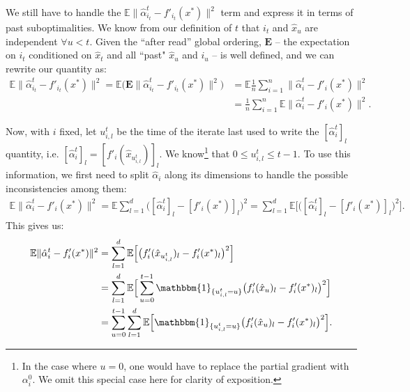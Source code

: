 \documentclass[twoside, 11pt]{article}
\newcommand{\E}{\mathbb{E}}
\newcommand{\Econd}{\mathbf{E}}
\newcommand{\ind}{\mathbbm{1}}
\begin{document}
We still have to handle the $\E \|\hat \alpha_{i_t}^t - f'_{i_t}(x^*)\|^2$ term and express it in terms of past suboptimalities.
We know from our definition of $t$ that $i_t$ and $\hat x_u$ are independent $\forall u<t$.
Given the ``after read'' global ordering, $\Econd$ -- the expectation on $i_t$ conditioned on $\hat x_t$ and all ``past" $\hat x_u$ and $i_u$ -- is well defined, and we can rewrite our quantity as:
\begin{align*}
\E \|\hat \alpha_{i_t}^t - f'_{i_t}(x^*)\|^2
= \E \big( \Econd \|\hat \alpha_{i_t}^t - f'_{i_t}(x^*)\|^2 \big)
&= \E \frac{1}{n} \sum_{i=1}^n  \|\hat \alpha_i^t - f'_i(x^*)\|^2
\\
&=  \frac{1}{n} \sum_{i=1}^n \E \|\hat \alpha_i^t - f'_i(x^*)\|^2 .
\end{align*}

Now, with $i$ fixed, let $u_{i,l}^t$ be the time of the iterate last used to write the $[\hat \alpha_{i}^t]_l$ quantity, i.e. $[\hat \alpha_{i}^t]_l = [f'_{i}(\hat x_{u_{i, l}^t})]_l$.
We know\footnote{In the case where $u=0$, one would have to replace the partial gradient with $\alpha_i^0$. We omit this special case here for clarity of exposition.} that $0 \leq u_{i,l}^t \leq t - 1$.
To use this information, we first need to split $\hat \alpha_i$ along its dimensions to handle the possible inconsistencies among them:
\begin{align*}
\E \|\hat \alpha_i^t - f'_i(x^*)\|^2
=
\E \sum_{l=1}^d \big([\hat \alpha_i^t]_l-[f'_i(x^*)]_l\big)^2
=
\sum_{l=1}^d \E \Big[ \big([\hat \alpha_i^t]_l-[f'_i(x^*)]_l\big)^2 \Big] .
\end{align*}
This gives us:
\begin{align}
\E \|\hat \alpha_i^t - f'_i(x^*)\|^2
&=
\sum_{l=1}^d \E \Big[ \big(f'_{i}(\hat x_{u_{i, l}^t})_l-f'_i(x^*)_l\big)^2 \Big] \notag \\
&=
\sum_{l=1}^d\E \Big[\sum_{u=0}^{t-1} \ind_{\{u_{i, l}^t = u\}} \big(f'_i(\hat x_u)_l-f'_i(x^*)_l\big)^2 \Big] \notag \\
&=
\sum_{u=0}^{t-1} \sum_{l=1}^d\E \Big[\ind_{\{u_{i, l}^t = u\}} \big(f'_i(\hat x_u)_l-f'_i(x^*)_l\big)^2 \Big]
\label{eq:IndicatorsAppearance}.
\end{align}
\end{document}
